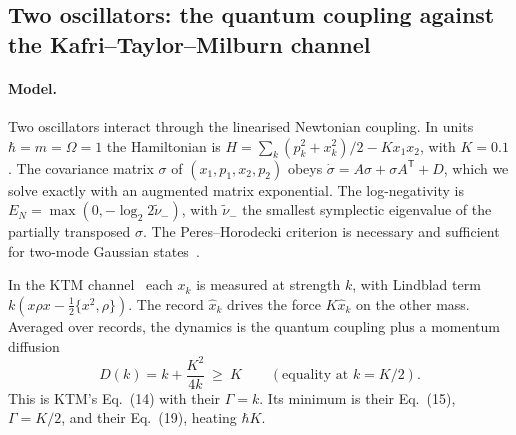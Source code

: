 \subsection{Two oscillators: the quantum coupling against the Kafri--Taylor--Milburn channel}\label{ss:gs-ktm}

\paragraph{Model.} Two oscillators interact through the linearised Newtonian coupling. In units $\hbar=m=\Omega=1$ the Hamiltonian is
$H=\sum_k(p_k^2+x_k^2)/2-Kx_1x_2$, with $K=0.1$. The covariance matrix $\sigma$ of $(x_1,p_1,x_2,p_2)$ obeys
$\dot\sigma=A\sigma+\sigma A^{\mathsf T}+D$, which we solve exactly with an augmented matrix exponential. The log-negativity is
$E_N=\max(0,-\log_2 2\tilde\nu_-)$, with $\tilde\nu_-$ the smallest symplectic eigenvalue of the partially transposed $\sigma$. The
Peres--Horodecki criterion is necessary and sufficient for two-mode Gaussian states~\cite{simon2000}.

In the KTM channel~\cite{ktm} each $x_k$ is measured at strength $k$, with Lindblad term $k(x\rho x-\tfrac12\{x^2,\rho\})$. The record
$\hat x_k$ drives the force $K\hat x_k$ on the other mass. Averaged over records, the dynamics is the quantum coupling plus a momentum
diffusion
\begin{equation}\label{eq:gs-ktm}
D(k)=k+\frac{K^2}{4k}\ \ge\ K \qquad (\text{equality at } k=K/2).
\end{equation}
This is KTM's Eq.~(14) with their $\Gamma=k$. Its minimum is their Eq.~(15), $\Gamma=K/2$, and their Eq.~(19), heating $\hbar K$.

